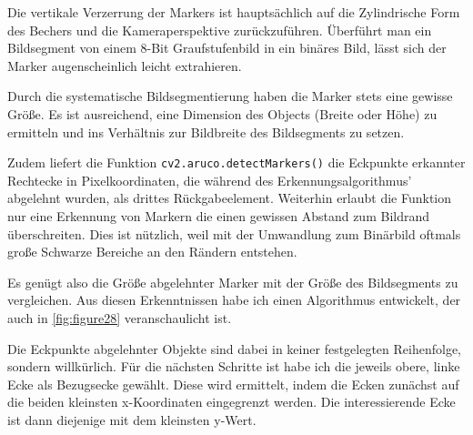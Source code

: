     Die vertikale Verzerrung der Markers ist hauptsächlich auf die Zylindrische Form des Bechers und die Kameraperspektive zurückzuführen. 
    Überführt man ein Bildsegment von einem 8-Bit Graufstufenbild in ein binäres Bild, lässt sich der Marker augenscheinlich leicht extrahieren. 
    
    Durch die systematische Bildsegmentierung haben die Marker stets eine gewisse Größe. 
    Es ist ausreichend, eine Dimension des Objects (Breite oder Höhe) zu ermitteln und ins Verhältnis zur Bildbreite des Bildsegments zu setzen.

    Zudem liefert die Funktion \verb|cv2.aruco.detectMarkers()| die Eckpunkte erkannter \\Rechtecke in Pixelkoordinaten, die während des Erkennungsalgorithmus' abgelehnt wurden, als drittes Rückgabeelement. 
    Weiterhin erlaubt die Funktion nur eine Erkennung von Markern die einen gewissen Abstand zum Bildrand überschreiten. 
    Dies ist nützlich, weil mit der Umwandlung zum Binärbild oftmals große Schwarze Bereiche an den Rändern entstehen.
    
    Es genügt also die Größe abgelehnter Marker mit der Größe des Bildsegments zu vergleichen. 
    Aus diesen Erkenntnissen habe ich einen Algorithmus entwickelt, der auch in \ref{fig:figure28} veranschaulicht ist.

    Die Eckpunkte abgelehnter Objekte sind dabei in keiner festgelegten Reihenfolge, sondern willkürlich. 
    Für die nächsten Schritte ist habe ich die jeweils obere, linke Ecke als Bezugsecke gewählt.
    Diese wird ermittelt, indem die Ecken zunächst auf die beiden kleinsten x-Koordinaten eingegrenzt werden. 
    Die interessierende Ecke ist dann diejenige mit dem kleinsten y-Wert.

